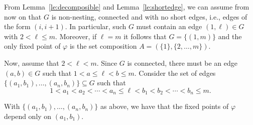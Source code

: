 From Lemma~\ref{le:decomposible} and Lemma~\ref{le:shortedge}, we can assume from now on that $G$ is non-nesting, connected and with no short edges, i.e., edges of the form $(i,i+1)$. In particular, such $G$ must contain an edge $(1,\ell)\in G$ with $2<\ell\le m$. Moreover, if $\ell=m$ it follows that $G=\{(1,m)\}$ and the only fixed point of $\varphi$ is the set composition $A=(\{1\},\{2,\ldots,m\})$. 


Now, assume that $2<\ell<m$. Since $G$ is connected, there must be an edge
$(a,b)\in G$ such that $1<a\le \ell<b\le m$. Consider the set of edges $\big\{(a_1,b_1),\ldots,(a_n,b_n)\big\}\subseteq G$ such that $$1<a_1<a_2<\cdots<a_n\le\ell<b_1<b_2<\cdots< b_n\le m.$$

\begin{lemma}\label{le:nequal1} With $\big\{(a_1,b_1),\ldots,(a_n,b_n)\big\}$ as above, we have that the fixed points of $\varphi$ depend only on $(a_1,b_1)$.
\end{lemma}

